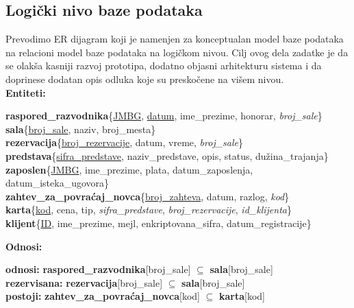 \documentclass[a4paper]{article}
\begin{document}
\subsection{Logički nivo baze podataka}

Prevodimo ER dijagram koji je namenjen za konceptualan model baze podataka na relacioni model baze
podataka na logičkom nivou. Cilj ovog dela zadatke je da se olakša kasniji razvoj prototipa, dodatno
objasni arhitekturu sistema i da doprinese dodatan
opis odluka koje su preskočene na višem nivou. \\

\noindent\textbf{Entiteti:}

\textbf{raspored\_razvodnika}\{\underline{JMBG}, \underline{datum}, ime\_prezime, honorar, \textit{broj\_sale}\}\\

\textbf{sala}\{\underline{broj\_sale}, naziv, broj\_mesta\}\\

\textbf{rezervacija}\{\underline{broj\_rezervacije}, datum, vreme, \textit{broj\_sale}\}\\

\textbf{predstava}\{\underline{sifra\_predstave}, naziv\_predstave, opis, status, dužina\_trajanja\}\\

\textbf{zaposlen}\{\underline{JMBG}, ime\_prezime, plata, datum\_zaposlenja, datum\_isteka\_ugovora\}\\

\textbf{zahtev\_za\_povraćaj\_novca}\{\underline{broj\_zahteva}, datum, razlog, \textit{kod}\}\\

\textbf{karta}\{\underline{kod}, cena, tip, \textit{sifra\_predstave}, \textit{broj\_rezervacije}, \textit{id\_klijenta}\}\\

\textbf{klijent}\{\underline{ID}, ime\_prezime, mejl, enkriptovana\_sifra, datum\_registracije\}  

\noindent\textbf{Odnosi:}

\textbf{odnosi:} \textbf{raspored\_razvodnika}[broj\_sale] $\subseteq$ \textbf{sala}[broj\_sale]\\

\textbf{rezervisana:} \textbf{rezervacija}[broj\_sale] $\subseteq$ \textbf{sala}[broj\_sale]\\

\textbf{postoji:} \textbf{zahtev\_za\_povraćaj\_novca}[kod] $\subseteq$ \textbf{karta}[kod]\\
\end{document}
